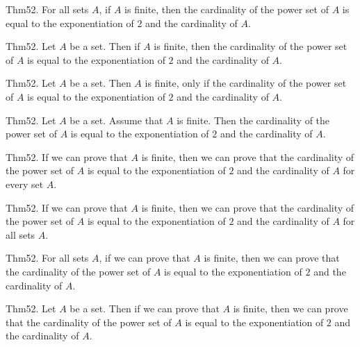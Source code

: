 \documentclass{article}
\begin{document}
Thm52. For all sets $A$, if $A$ is finite, then the cardinality of the power set of $A$ is equal to the exponentiation of $2$ and the cardinality of $A$.

Thm52. Let $A$ be a set. Then if $A$ is finite, then the cardinality of the power set of $A$ is equal to the exponentiation of $2$ and the cardinality of $A$.

Thm52. Let $A$ be a set. Then $A$ is finite, only if the cardinality of the power set of $A$ is equal to the exponentiation of $2$ and the cardinality of $A$.

Thm52. Let $A$ be a set. Assume that $A$ is finite. Then the cardinality of the power set of $A$ is equal to the exponentiation of $2$ and the cardinality of $A$.

Thm52. If we can prove that $A$ is finite, then we can prove that the cardinality of the power set of $A$ is equal to the exponentiation of $2$ and the cardinality of $A$ for every set $A$.

Thm52. If we can prove that $A$ is finite, then we can prove that the cardinality of the power set of $A$ is equal to the exponentiation of $2$ and the cardinality of $A$ for all sets $A$.

Thm52. For all sets $A$, if we can prove that $A$ is finite, then we can prove that the cardinality of the power set of $A$ is equal to the exponentiation of $2$ and the cardinality of $A$.

Thm52. Let $A$ be a set. Then if we can prove that $A$ is finite, then we can prove that the cardinality of the power set of $A$ is equal to the exponentiation of $2$ and the cardinality of $A$.
\end{document}
